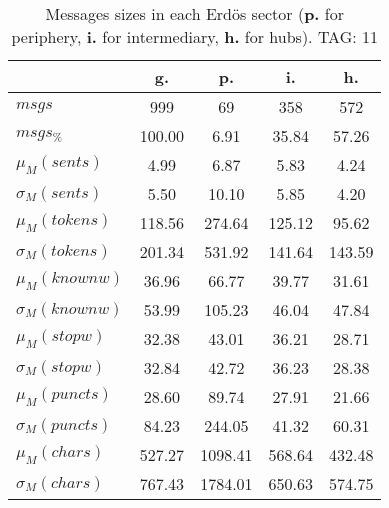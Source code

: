 \begin{table}[h!]
\begin{center}
\begin{tabular}{| l | c | c | c | c |}\hline
 & g. & p. & i. & h. \\\hline
$msgs$ & 999  & 69  & 358  & 572 \\\hline
$msgs_{\%}$ & 100.00  & 6.91  & 35.84  & 57.26 \\\hline
$\mu_M(sents)$ & 4.99  & 6.87  & 5.83  & 4.24 \\\hline
$\sigma_M(sents)$ & 5.50  & 10.10  & 5.85  & 4.20 \\\hline
$\mu_M(tokens)$ & 118.56  & 274.64  & 125.12  & 95.62 \\\hline
$\sigma_M(tokens)$ & 201.34  & 531.92  & 141.64  & 143.59 \\\hline
$\mu_M(knownw)$ & 36.96  & 66.77  & 39.77  & 31.61 \\\hline
$\sigma_M(knownw)$ & 53.99  & 105.23  & 46.04  & 47.84 \\\hline
$\mu_M(stopw)$ & 32.38  & 43.01  & 36.21  & 28.71 \\\hline
$\sigma_M(stopw)$ & 32.84  & 42.72  & 36.23  & 28.38 \\\hline
$\mu_M(puncts)$ & 28.60  & 89.74  & 27.91  & 21.66 \\\hline
$\sigma_M(puncts)$ & 84.23  & 244.05  & 41.32  & 60.31 \\\hline
$\mu_M(chars)$ & 527.27  & 1098.41  & 568.64  & 432.48 \\\hline
$\sigma_M(chars)$ & 767.43  & 1784.01  & 650.63  & 574.75 \\\hline
\end{tabular}
\caption{Messages sizes in each Erd\"os sector ({{\bf p.}} for periphery, {{\bf i.}} for intermediary, {{\bf h.}} for hubs). TAG: 11}
\end{center}
\end{table}